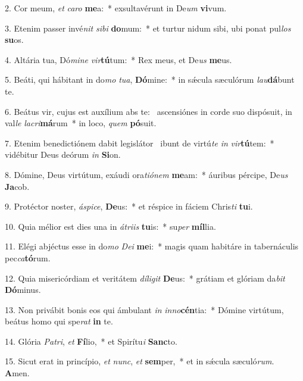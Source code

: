 2. Cor meum, \textit{et} \textit{ca}\textit{ro} \textbf{me}a:~*  exsultavérunt in De\textit{um} \textbf{vi}vum.\

3. Etenim passer invé\textit{nit} \textit{si}\textit{bi} \textbf{do}mum:~*  et turtur nidum sibi, ubi ponat pul\textit{los} \textbf{su}os.\

4. Altária tua, Dó\textit{mi}\textit{ne} \textit{vir}\textbf{tú}tum:~*  Rex meus, et De\textit{us} \textbf{me}us.\

5. Beáti, qui hábitant in do\textit{mo} \textit{tu}\textit{a}, \textbf{Dó}mine:~*  in sǽcula sæculórum \textit{lau}\textbf{dá}bunt te.\

6. Beátus vir, cujus est auxílium abs te: \dag\  ascensiónes in corde suo dispósuit, in val\textit{le} \textit{la}\textit{cri}\textbf{má}rum~*  in loco, \textit{quem} \textbf{pó}suit.\

7. Etenim benedictiónem dabit legislátor \dag\  ibunt de virtú\textit{te} \textit{in} \textit{vir}\textbf{tú}tem:~*  vidébitur Deus deórum \textit{in} \textbf{Si}on.\

8. Dómine, Deus virtútum, exáudi ora\textit{ti}\textit{ó}\textit{nem} \textbf{me}am:~*  áuribus pércipe, De\textit{us} \textbf{Ja}cob.\

9. Protéctor noster, \textit{á}\textit{spi}\textit{ce}, \textbf{De}us:~*  et réspice in fáciem Chris\textit{ti} \textbf{tu}i.\

10. Quia mélior est dies una in \textit{á}\textit{tri}\textit{is} \textbf{tu}is:~*  su\textit{per} \textbf{míl}lia.\

11. Elégi abjéctus esse in do\textit{mo} \textit{De}\textit{i} \textbf{me}i:~*  magis quam habitáre in tabernáculis pec\textit{ca}\textbf{tó}rum.\

12. Quia misericórdiam et veritátem \textit{dí}\textit{li}\textit{git} \textbf{De}us:~*  grátiam et glóriam da\textit{bit} \textbf{Dó}minus.\

13. Non privábit bonis eos qui ámbulant \textit{in} \textit{in}\textit{no}\textbf{cén}tia:~*  Dómine virtútum, beátus homo qui spe\textit{rat} \textbf{in} te.\

14. Glória \textit{Pa}\textit{tri}, \textit{et} \textbf{Fí}lio,~*  et Spirítu\textit{i} \textbf{Sanc}to.\

15. Sicut erat in princípio, \textit{et} \textit{nunc}, \textit{et} \textbf{sem}per,~*  et in sǽcula sæculó\textit{rum}. \textbf{A}men.\

